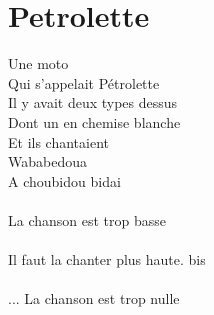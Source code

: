\section*{Petrolette}
Une moto\\
Qui s’appelait Pétrolette\\
Il y avait deux types dessus\\
Dont un en chemise blanche\\
Et ils chantaient\\
Wababedoua\\
A choubidou bidai\\
\\
La chanson est trop basse\\
\\
Il faut la chanter plus haute. bis\\
\\
... La chanson est trop nulle\\
